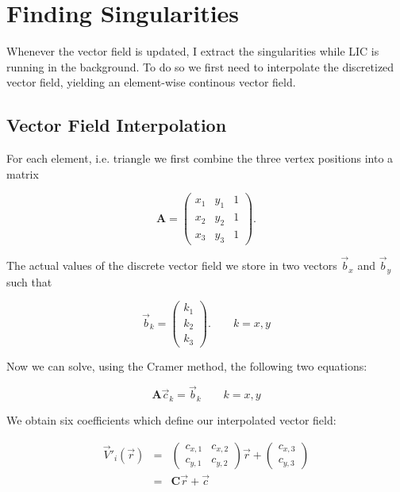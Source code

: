 \documentclass[a4paper,10pt,notitlepage]{scrreprt}
\newcommand{\mat}[1]{\mathbf{#1}}
\begin{document}
\section{Finding Singularities}

Whenever the vector field is updated, I extract the singularities while LIC is
running in the background. To do so we first need to interpolate the discretized
vector field, yielding an element-wise continous vector field.

\subsection{Vector Field Interpolation}

For each element, i.e. triangle we first combine the three vertex positions
into a matrix

\begin{equation}
 \mat{A} = \left(
\begin{array}{ccc}
x_1 & y_1 & 1 \\
x_2 & y_2 & 1 \\
x_3 & y_3 & 1 \end{array} \right).
\end{equation}

The actual values of the discrete vector field we store in two vectors
$\vec{b}_x$ and $\vec{b}_y$ such that

\begin{equation}
 \vec{b}_{k} = \left( \begin{array}{c} k_1 \\ k_2 \\ k_3 \end{array} \right) .
\qquad k = x,y
\end{equation}

Now we can solve, using the Cramer method, the following two equations:

\begin{equation}
 \mat{A} \vec{c}_k = \vec{b}_k \qquad k = x,y
\end{equation}

We obtain six coefficients which define our interpolated vector field:

\begin{eqnarray}
 \vec{V}'_i(\vec{r}) &=& \left(
\begin{array}{cc}
c_{x,1} & c_{x,2} \\
c_{y,1} & c_{y,2} \end{array} \right) \vec{r} + \left( \begin{array}{c} c_{x,3}
\\ c_{y,3} \end{array} \right) \\
 &=& \mat{C} \vec{r} + \vec{c}
\label{eq:interpolated-field}
\end{eqnarray}
\end{document}
